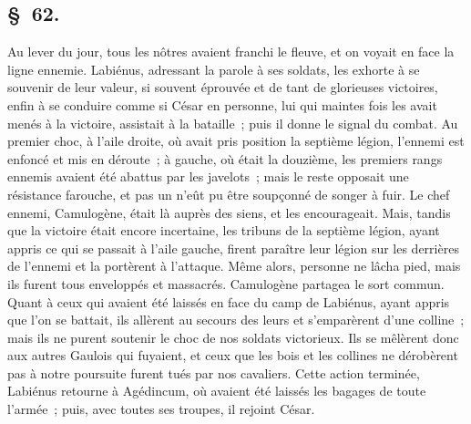 \documentclass[french,twoside]{book} %
\begin{document}
\subsection[{§ 62.}]{ \textsc{§ 62.} }
\noindent Au lever du jour, tous les nôtres avaient franchi le fleuve, et on voyait en face la ligne ennemie. Labiénus, adressant la parole à ses soldats, les exhorte à se souvenir de leur valeur, si souvent éprouvée et de tant de glorieuses victoires, enfin à se conduire comme si César en personne, lui qui maintes fois les avait menés à la victoire, assistait à la bataille ; puis il donne le signal du combat. Au premier choc, à l’aile droite, où avait pris position la septième légion, l’ennemi est enfoncé et mis en déroute ; à gauche, où était la douzième, les premiers rangs ennemis avaient été abattus par les javelots ; mais le reste opposait une résistance farouche, et pas un n’eût pu être soupçonné de songer à fuir. Le chef ennemi, Camulogène, était là auprès des siens, et les encourageait. Mais, tandis que la victoire était encore incertaine, les tribuns de la septième légion, ayant appris ce qui se passait à l’aile gauche, firent paraître leur légion sur les derrières de l’ennemi et la portèrent à l’attaque. Même alors, personne ne lâcha pied, mais ils furent tous enveloppés et massacrés. Camulogène partagea le sort commun. Quant à ceux qui avaient été laissés en face du camp de Labiénus, ayant appris que l’on se battait, ils allèrent au secours des leurs et s’emparèrent d’une colline ; mais ils ne purent soutenir le choc de nos soldats victorieux. Ils se mêlèrent donc aux autres Gaulois qui fuyaient, et ceux que les bois et les collines ne dérobèrent pas à notre poursuite furent tués par nos cavaliers. Cette action terminée, Labiénus retourne à Agédincum, où avaient été laissés les bagages de toute l’armée ; puis, avec toutes ses troupes, il rejoint César.
\end{document}
